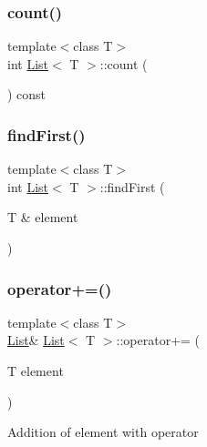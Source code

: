 \mbox{\label{class_list_a7a74fc01260437fac92355dc8d4e789c}} 
\subsubsection{\texorpdfstring{count()}{count()}}
{\footnotesize\ttfamily template$<$class T$>$ \\
int \hyperlink{class_list}{List}$<$ T $>$\+::count (\begin{DoxyParamCaption}{ }\end{DoxyParamCaption}) const\hspace{0.3cm}{\ttfamily [inline]}}

\mbox{\label{class_list_aab90a0362da4ba513ac5460af21e1adb}} 
\subsubsection{\texorpdfstring{find\+First()}{findFirst()}}
{\footnotesize\ttfamily template$<$class T$>$ \\
int \hyperlink{class_list}{List}$<$ T $>$\+::find\+First (\begin{DoxyParamCaption}\item[{T \&}]{element }\end{DoxyParamCaption})\hspace{0.3cm}{\ttfamily [inline]}}

\mbox{\label{class_list_a81a44c4aae9bb74b5166004cd28d9ac6}} 
\subsubsection{\texorpdfstring{operator+=()}{operator+=()}}
{\footnotesize\ttfamily template$<$class T$>$ \\
\hyperlink{class_list}{List}\& \hyperlink{class_list}{List}$<$ T $>$\+::operator+= (\begin{DoxyParamCaption}\item[{T}]{element }\end{DoxyParamCaption})\hspace{0.3cm}{\ttfamily [inline]}}

Addition of element with operator \mbox{\label{class_list_af9d0336374aa0025662e16f2b087819c}} 
